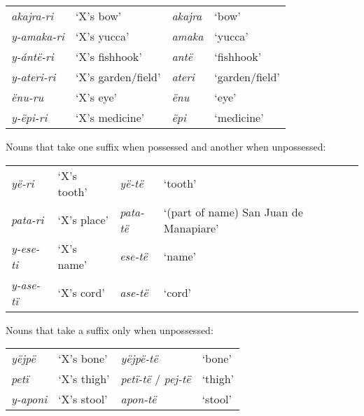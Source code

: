\documentclass{memoir}
\begin{document}
\begin{tabular}[t]{llll}

 \emph{akajra-ri} &          ‘X’s bow’ & \emph{akajra} &          ‘bow’ \\

\emph{y-amaka-ri} &        ‘X’s yucca’ &  \emph{amaka} &        ‘yucca’ \\
 \emph{y-ántë-ri} &     ‘X’s fishhook’ &   \emph{antë} &     ‘fishhook’ \\
\emph{y-ateri-ri} & ‘X’s garden/field’ &  \emph{ateri} & ‘garden/field’ \\
    \emph{ënu-ru} &          ‘X’s eye’ &    \emph{ënu} &          ‘eye’ \\
  \emph{y-ëpi-ri} &     ‘X’s medicine’ &    \emph{ëpi} &     ‘medicine’ \\

\end{tabular}
 \xe

\ex\label{diffpossessed} Nouns that take one suffix when possessed and
another when unpossessed:

\begin{tabular}[t]{llll}

   \emph{yë-ri} & ‘X’s tooth’ &   \emph{yë-të} &                                ‘tooth’ \\

 \emph{pata-ri} & ‘X’s place’ & \emph{pata-të} & ‘(part of name) San Juan de Manapiare’ \\
\emph{y-ese-ti} & ‘X’s name’  &  \emph{ese-të} &                                 ‘name’ \\
\emph{y-ase-tï} & ‘X’s cord’  &  \emph{ase-të} &                                 ‘cord’ \\

\end{tabular}
 \xe

\ex\label{suffunpossessed} Nouns that take a suffix only when
unpossessed:

\begin{tabular}[t]{llll}

  \emph{yëjpë} &  ‘X’s bone’ &                \emph{yëjpë-të} &  ‘bone’ \\

   \emph{petï} & ‘X’s thigh’ & \emph{petï-të} / \emph{pej-të} & ‘thigh’ \\
\emph{y-aponi} & ‘X’s stool’ &                 \emph{apon-të} & ‘stool’ \\

\end{tabular}
 \xe
\end{document}
